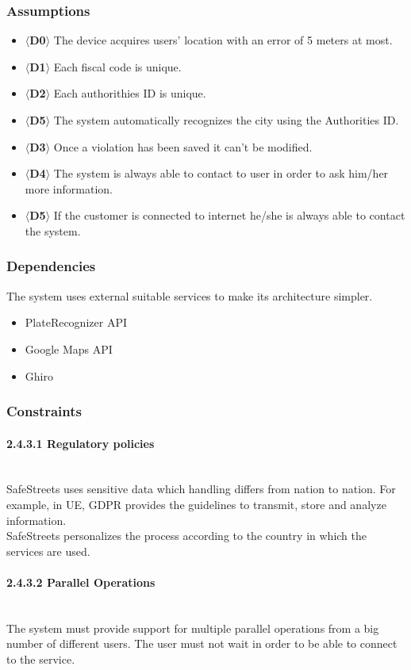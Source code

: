 \documentclass{article}
\begin{document}
\subsubsection{Assumptions}
\begin{itemize}
    \item $\langle$\textbf{D0}$\rangle$ The device acquires users' location with
    an error of 5 meters at most.
    \item $\langle$\textbf{D1}$\rangle$ Each fiscal code is unique.
    \item $\langle$\textbf{D2}$\rangle$ Each authorithies ID is unique.
    \item $\langle$\textbf{D5}$\rangle$ The system automatically recognizes the
    city using the Authorities ID.
    \item $\langle$\textbf{D3}$\rangle$ Once a violation has been saved it can't
    be modified.
    \item $\langle$\textbf{D4}$\rangle$ The system is always able to contact to
    user in order to ask him/her more information.
    \item $\langle$\textbf{D5}$\rangle$ If the customer is connected to internet
    he/she is always able to contact the system.
\end{itemize}
\subsubsection{Dependencies}
The system uses external suitable services to make its architecture simpler.
\begin{itemize}
    \item PlateRecognizer API
    \item Google Maps API
    \item Ghiro
\end{itemize}
\subsubsection{Constraints}
\paragraph{2.4.3.1 Regulatory policies}\mbox{}\\
SafeStreets uses sensitive data which handling differs from nation to nation.
For example, in UE, GDPR provides the guidelines to transmit, store and analyze
information.\\ SafeStreets personalizes the process according to the country in
which the services are used. \paragraph{2.4.3.2 Parallel Operations}\mbox{}\\
The system must provide support for multiple parallel operations from a big
number of different users. The user must not wait in order to be able to connect
to the service.
\newpage
\end{document}
